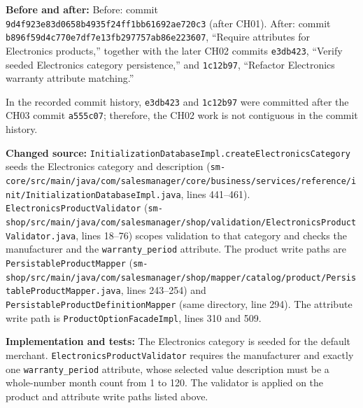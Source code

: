 \documentclass[11pt,a4paper]{article}
\begin{document}
\textbf{Before and after:} Before: commit \texttt{9d4f923e83d0658b4935f24ff1bb61692ae720c3} (after CH01). After: commit \texttt{b896f59d4c770e7df7e13fb297757ab86e223607}, ``Require attributes for Electronics products,'' together with the later CH02 commits \texttt{e3db423}, ``Verify seeded Electronics category persistence,'' and \texttt{1c12b97}, ``Refactor Electronics warranty attribute matching.''

In the recorded commit history, \texttt{e3db423} and \texttt{1c12b97} were committed after the CH03 commit \texttt{a555c07}; therefore, the CH02 work is not contiguous in the commit history.

\textbf{Changed source:} \texttt{InitializationDatabaseImpl.\allowbreak{}createElectronicsCategory} seeds the Electronics category and description (\texttt{sm-\allowbreak{}core/\allowbreak{}src/\allowbreak{}main/\allowbreak{}java/\allowbreak{}com/\allowbreak{}salesmanager/\allowbreak{}core/\allowbreak{}business/\allowbreak{}services/\allowbreak{}reference/\allowbreak{}init/\allowbreak{}InitializationDatabaseImpl.\allowbreak{}java}, lines 441--461). \texttt{Electronics\allowbreak{}Product\allowbreak{}Validator} (\texttt{sm-\allowbreak{}shop/\allowbreak{}src/\allowbreak{}main/\allowbreak{}java/\allowbreak{}com/\allowbreak{}salesmanager/\allowbreak{}shop/\allowbreak{}validation/\allowbreak{}ElectronicsProductValidator.\allowbreak{}java}, lines 18--76) scopes validation to that category and checks the manufacturer and the \texttt{warranty\_period} attribute. The product write paths are \texttt{Persistable\allowbreak{}Product\allowbreak{}Mapper} (\texttt{sm-\allowbreak{}shop/\allowbreak{}src/\allowbreak{}main/\allowbreak{}java/\allowbreak{}com/\allowbreak{}salesmanager/\allowbreak{}shop/\allowbreak{}mapper/\allowbreak{}catalog/\allowbreak{}product/\allowbreak{}PersistableProductMapper.\allowbreak{}java}, lines 243--254) and \texttt{Persistable\allowbreak{}Product\allowbreak{}Definition\allowbreak{}Mapper} (same directory, line 294). The attribute write path is \texttt{Product\allowbreak{}Option\allowbreak{}Facade\allowbreak{}Impl}, lines 310 and 509.

\textbf{Implementation and tests:} The Electronics category is seeded for the default merchant. \texttt{Electronics\allowbreak{}Product\allowbreak{}Validator} requires the manufacturer and exactly one \texttt{warranty\_period} attribute, whose selected value description must be a whole-number month count from 1 to 120. The validator is applied on the product and attribute write paths listed above.
\end{document}
